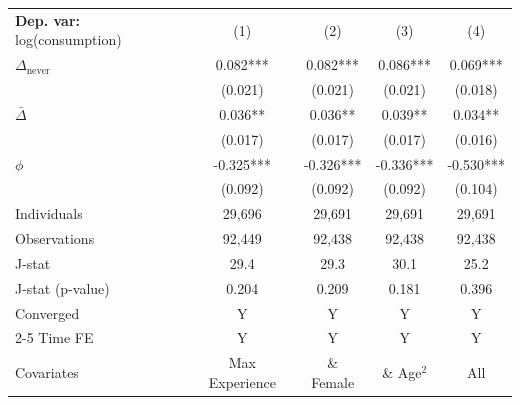 \begin{tabular}{l cccc} \toprule  \textbf{Dep. var:}  log(consumption) 
                    &\multicolumn{1}{c}{(1)}   &\multicolumn{1}{c}{(2)}   &\multicolumn{1}{c}{(3)}   &\multicolumn{1}{c}{(4)}   \\

\addlinespace
$\Delta_{\text{never}}$&       0.082***&       0.082***&       0.086***&       0.069***\\
                    &     (0.021)   &     (0.021)   &     (0.021)   &     (0.018)   \\

\addlinespace
$\bar{\Delta}$      &       0.036** &       0.036** &       0.039** &       0.034** \\
                    &     (0.017)   &     (0.017)   &     (0.017)   &     (0.016)   \\

\addlinespace
$\phi$              &      -0.325***&      -0.326***&      -0.336***&      -0.530***\\
                    &     (0.092)   &     (0.092)   &     (0.092)   &     (0.104)   \\
\addlinespace
Individuals         &      29,696   &      29,691   &      29,691   &      29,691   \\
Observations        &      92,449   &      92,438   &      92,438   &      92,438   \\
J-stat              &        29.4   &        29.3   &        30.1   &        25.2   \\
J-stat (p-value)    &       0.204   &       0.209   &       0.181   &       0.396   \\
Converged           &           Y   &           Y   &           Y   &           Y   \\
\cmidrule{2-5} Time FE & Y & Y & Y & Y \\ Covariates & Max Experience & \& Female & \& Age$^2$ & All \\ \bottomrule \end{tabular}
